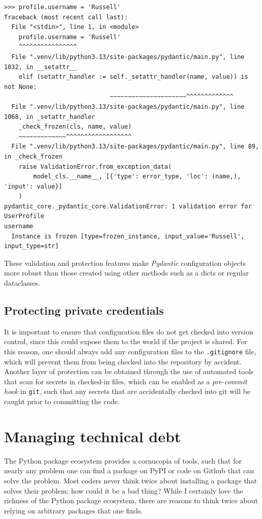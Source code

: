 \begin{lstlisting}[style=repl]
>>> profile.username = 'Russell'
Traceback (most recent call last):
  File "<stdin>", line 1, in <module>
    profile.username = 'Russell'
    ^^^^^^^^^^^^^^^^
  File ".venv/lib/python3.13/site-packages/pydantic/main.py", line 1032, in __setattr__
    elif (setattr_handler := self._setattr_handler(name, value)) is not None:
                             ~~~~~~~~~~~~~~~~~~~~~^^^^^^^^^^^^^
  File ".venv/lib/python3.13/site-packages/pydantic/main.py", line 1068, in _setattr_handler
    _check_frozen(cls, name, value)
    ~~~~~~~~~~~~~^^^^^^^^^^^^^^^^^^
  File ".venv/lib/python3.13/site-packages/pydantic/main.py", line 89, in _check_frozen
    raise ValidationError.from_exception_data(
        model_cls.__name__, [{'type': error_type, 'loc': (name,), 'input': value}]
    )
pydantic_core._pydantic_core.ValidationError: 1 validation error for UserProfile
username
  Instance is frozen [type=frozen_instance, input_value='Russell', input_type=str]
\end{lstlisting}

These validation and protection features make \textit{Pydantic} configuration objects more robust than those created using other methods such as a dicts or regular dataclasses.

\subsection{Protecting private credentials}

It is important to ensure that configuration files do not get checked into version control, since this could expose them to the world if the project is shared.
For this reason, one should always add any configuration files to the \texttt{.gitignore} file, which will prevent them from being checked into the repository by accident.
Another layer of protection can be obtained through the use of automated tools that scan for secrets in checked-in files, which can be enabled as a \textit{pre-commit hook} in \texttt{git}, such that any secrets that are accidentally checked into git will be caught prior to committing the code.

\section{Managing technical debt}

The Python package ecosystem provides a cornucopia of tools, such that for nearly any problem one can find a package on PyPI or code on Github that can solve the problem.
Most coders never think twice about installing a package that solves their problem; how could it be a bad thing? While I certainly love the richness of the Python package ecosystem, there are reasons to think twice about relying on arbitrary packages that one finds.

